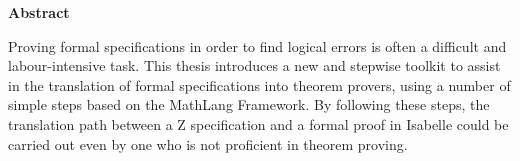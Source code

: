 \begin{center}
\LARGE\textbf {Abstract}
\end{center}
\vspace{1cm}

\begin{spacing}{1} 
\noindent
Proving formal specifications in order to find logical errors is often a difficult and labour-intensive task. This thesis introduces a new and stepwise toolkit to assist in the translation of formal specifications into theorem provers, using a number of simple steps based on the MathLang Framework. By following these steps, the translation path between a Z specification and a formal proof in Isabelle could be carried out even by one who is not proficient in theorem proving.\\



\end{spacing}